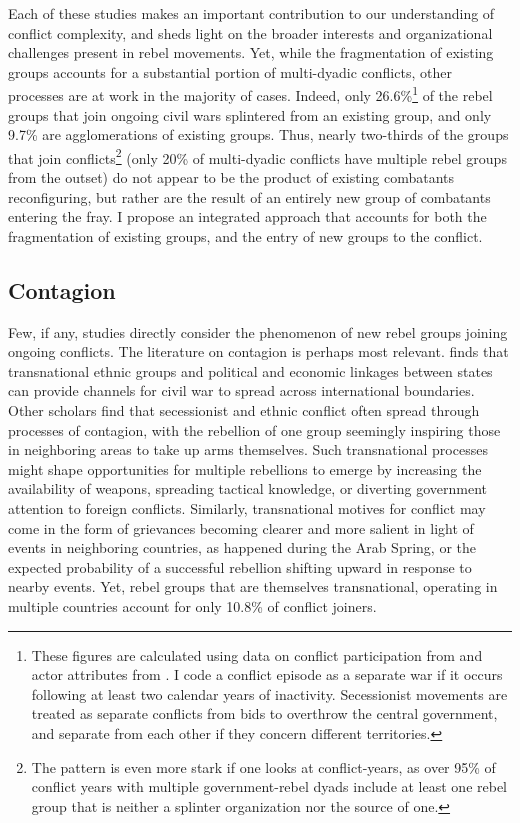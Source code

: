 Each of these studies makes an important contribution to our understanding of conflict complexity, and sheds light on the broader interests and organizational challenges present in rebel movements. Yet, while the fragmentation of existing groups accounts for a substantial portion of multi-dyadic conflicts, other processes are at work in the majority of cases. Indeed, only 26.6\%\footnote{These figures are calculated using data on conflict participation from \citep{Pettersson2015a} and actor attributes from \citep{ucdpactor}. I code a conflict episode as a separate war if it occurs following at least two calendar years of inactivity. Secessionist movements are treated as separate conflicts from bids to overthrow the central government, and separate from each other if they concern different territories.} of the rebel groups that join ongoing civil wars splintered from an existing group, and only 9.7\% are agglomerations of existing groups. Thus, nearly two-thirds of the groups that join conflicts\footnote{The pattern is even more stark if one looks at conflict-years, as over 95\% of conflict years with multiple government-rebel dyads include at least one rebel group that is neither a splinter organization nor the source of one.} (only 20\% of multi-dyadic conflicts have multiple rebel groups from the outset) do not appear to be the product of existing combatants reconfiguring, but rather are the result of an entirely new group of combatants entering the fray. I propose an integrated approach that accounts for both the fragmentation of existing groups, and the entry of new groups to the conflict.

\subsection{Contagion}

Few, if any, studies directly consider the phenomenon of new rebel groups joining ongoing conflicts. The literature on contagion is perhaps most relevant. \citet{Gleditsch2007} finds that transnational ethnic groups and political and economic linkages between states can provide channels for civil war to spread across international boundaries. Other scholars find that secessionist \citep{Ayres2000} and ethnic \citep{Lane2016} conflict often spread through processes of contagion, with the rebellion of one group seemingly inspiring those in neighboring areas to take up arms themselves. Such transnational processes might shape opportunities for multiple rebellions to emerge by increasing the availability of weapons, spreading tactical knowledge, or diverting government attention to foreign conflicts. Similarly, transnational motives for conflict may come in the form of grievances becoming clearer and more salient in light of events in neighboring countries, as happened during the Arab Spring, or the expected probability of a successful rebellion shifting upward in response to nearby events. Yet, rebel groups that are themselves transnational, operating in multiple countries \citep[see][]{salehyan07} account for only 10.8\% of conflict joiners.

